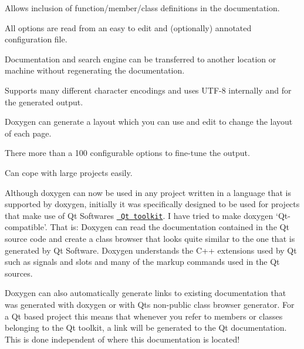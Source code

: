\begin{DoxyItemize}
\item Allows inclusion of function/member/class definitions in the documentation. 
\item All options are read from an easy to edit and (optionally) annotated configuration file. 
\item Documentation and search engine can be transferred to another location or machine without regenerating the documentation. 
\item Supports many different character encodings and uses U\+T\+F-\/8 internally and for the generated output. 
\item Doxygen can generate a layout which you can use and edit to change the layout of each page. 
\item There more than a 100 configurable options to fine-\/tune the output. 
\item Can cope with large projects easily. 
\end{DoxyItemize}

Although doxygen can now be used in any project written in a language that is supported by doxygen, initially it was specifically designed to be used for projects that make use of Qt Software\textquotesingle{}s \href{https://www.qt.io/developers}{\texttt{ Qt toolkit}}. I have tried to make doxygen `Qt-\/compatible'. That is\+: Doxygen can read the documentation contained in the Qt source code and create a class browser that looks quite similar to the one that is generated by Qt Software. Doxygen understands the C++ extensions used by Qt such as signals and slots and many of the markup commands used in the Qt sources.

Doxygen can also automatically generate links to existing documentation that was generated with doxygen or with Qt\textquotesingle{}s non-\/public class browser generator. For a Qt based project this means that whenever you refer to members or classes belonging to the Qt toolkit, a link will be generated to the Qt documentation. This is done independent of where this documentation is located!

 